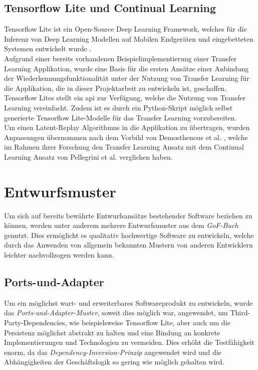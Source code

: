 \documentclass[oneside]{ausarbeitung}
\begin{document}
\subsection{Tensorflow Lite und Continual Learning}
Tensorflow Lite ist ein Open-Source Deep Learning Framework, welches für die Inferenz von Deep Learning Modellen auf Mobilen Endgeräten und eingebetteten Systemen entwickelt wurde \cite{tflite-site}.\\
Aufgrund einer bereits vorhandenen Beispielimplementierung einer Transfer Learning Applikation, wurde eine Basis für die ersten Ansätze einer Anbindung der Wiederkennungsfunktionalität unter der Nutzung von Transfer Learning für die Applikation, die in dieser Projektarbeit zu entwickeln ist, geschaffen.
Tensorflow Lites stellt ein \ac{api} zur Verfügung, welche die Nutzung von Transfer Learning vereinfacht. Zudem ist es durch ein Python-Skript möglich selbst generierte Tensorflow Lite-Modelle für das Transfer Learning vorzubereiten.\\
Um einen Latent-Replay Algorithmus in die Applikation zu übertragen, wurden Anpassungen übernommen nach dem Vorbild von Demosthenous et al. \cite{cl-vs-tl}, welche im Rahmen ihrer Forschung den Transfer Learning Ansatz mit dem Continual Learning Ansatz von Pellegrini et al. \cite{Pellegrini2019} verglichen haben.
\section{Entwurfsmuster}
Um sich auf bereits bewährte Entwurfsansätze bestehender Software beziehen zu können, werden unter anderem mehrere Entwurfsmuster aus dem \textit{GoF-Buch} genutzt. Dies ermöglicht es qualitativ hochwertige Software zu entwickeln, welche durch das Anwenden von allgemein bekannten Mustern von anderen Entwicklern leichter nachvollzogen werden kann.
\subsection{Ports-und-Adapter}
Um ein möglichst wart- und erweiterbares Softwareprodukt zu entwickeln, wurde das \textit{Ports-und-Adapter-Muster}, soweit dies möglich war, angewendet, um Third-Party-Dependencies, wie beispielsweise Tensorflow Lite, aber auch um die Persistenz möglichst abstrakt zu halten und eine Bindung an konkrete Implementierungen und Technologien zu vermeiden. Dies erhöht die Testfähigkeit enorm, da das \textit{Dependency-Inversion-Prinzip} angewendet wird und die Abhängigkeiten der Geschäftslogik so gering wie möglich gehalten wird.
\end{document}
